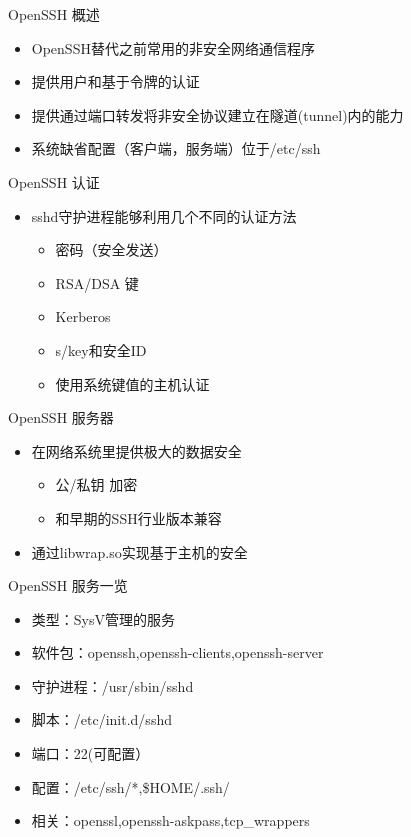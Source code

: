 \begin{frame}{OpenSSH 概述}
\begin{itemize}
\item OpenSSH替代之前常用的非安全网络通信程序
\item 提供用户和基于令牌的认证
\item 提供通过端口转发将非安全协议建立在隧道(tunnel)内的能力
\item 系统缺省配置（客户端，服务端）位于/etc/ssh
\end{itemize}

\end{frame} 
\begin{frame}{OpenSSH 认证}
\begin{itemize}
\item sshd守护进程能够利用几个不同的认证方法

\begin{itemize}
\item 密码（安全发送）
\item RSA/DSA 键
\item Kerberos
\item s/key和安全ID
\item 使用系统键值的主机认证
\end{itemize}
\end{itemize}

\end{frame} 
\begin{frame}{OpenSSH 服务器}
\begin{itemize}
\item 在网络系统里提供极大的数据安全

\begin{itemize}
\item 公/私钥 加密
\item 和早期的SSH行业版本兼容
\end{itemize}
\item 通过libwrap.so实现基于主机的安全
\end{itemize}

\end{frame} 
\begin{frame}{OpenSSH 服务一览}
\begin{itemize}
\item 类型：SysV管理的服务
\item 软件包：openssh,openssh-clients,openssh-server
\item 守护进程：/usr/sbin/sshd
\item 脚本：/etc/init.d/sshd
\item 端口：22(可配置）
\item 配置：/etc/ssh/{*},\$HOME/.ssh/
\item 相关：openssl,openssh-askpass,tcp\_wrappers
\end{itemize}

\end{frame} 

